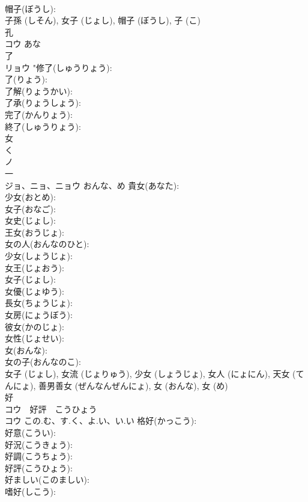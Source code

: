 \documentclass[8pt]{extreport}
\begin{document}
\begin{CJK}{UTF8}{min}
\\	帽子(ぼうし): 
\\	子孫 (しそん), 女子 (じょし), 帽子 (ぼうし), 子 (こ)
\\	孔			
\\	コウ	あな		
\\	了			
\\	リョウ		"修了(しゅうりょう): 
\\	了(りょう): 
\\	了解(りょうかい): 
\\	了承(りょうしょう): 
\\	完了(かんりょう): 
\\	終了(しゅうりょう): 
\\	女			
\\	く
\\	ノ
\\	一
\\	ジョ、ニョ、ニョウ	おんな、め	貴女(あなた): 
\\	少女(おとめ): 
\\	女子(おなご): 
\\	女史(じょし): 
\\	王女(おうじょ): 
\\	女の人(おんなのひと): 
\\	少女(しょうじょ): 
\\	女王(じょおう): 
\\	女子(じょし): 
\\	女優(じょゆう): 
\\	長女(ちょうじょ): 
\\	女房(にょうぼう): 
\\	彼女(かのじょ): 
\\	女性(じょせい): 
\\	女(おんな): 
\\	女の子(おんなのこ): 
\\	女子 (じょし), 女流 (じょりゅう), 少女 (しょうじょ), 女人 (にょにん), 天女 (てんにょ), 善男善女 (ぜんなんぜんにょ), 女 (おんな), 女 (め)
\\	好			
\\	コウ　好評　こうひょう
\\	コウ	この.む、す.く、よ.い、い.い	格好(かっこう): 
\\	好意(こうい): 
\\	好況(こうきょう): 
\\	好調(こうちょう): 
\\	好評(こうひょう): 
\\	好ましい(このましい): 
\\	嗜好(しこう): 

\end{CJK}
\end{document}
